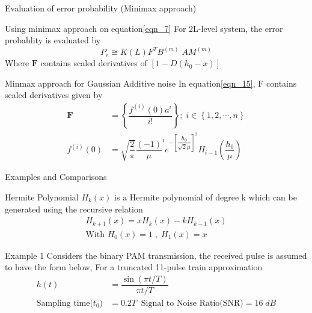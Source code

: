 \documentclass{beamer}
\providecommand{\mbf}{\boldsymbol}
\providecommand{\sbrak}[1]{\ensuremath{{}\left[#1\right]}}
\providecommand{\brak}[1]{\ensuremath{\left(#1\right)}}
\providecommand{\cbrak}[1]{\ensuremath{\left\{#1\right\}}}
\begin{document}
\begin{frame}{Evaluation of error probability (Minimax approach)}
\begin{block}{Using minimax approach on equation\eqref{eqn_7}}
For 2L-level system, the error probablity is evaluated by 
\begin{equation}
P_{e} \cong K(L)F^{T} B^{(m)}\;A M^{(m)}
\end{equation}
Where $\mbf{F}$ contains scaled derivatives of $\sbrak{1-D(h_{0}-x)}$
\end{block}
\begin{block}{Minmax approach for Gaussian Additive noise}
In equation\eqref{eqn_15}, F contains scaled derivatives given by
\begin{align}
\mbf{F} &= \cbrak{\dfrac{f^{(i)}(0) a^{i}}{i!}} ; \; i\in \cbrak{1,2,\cdots,n} \\
f^{(i)}(0) &= \sqrt{\dfrac{2}{\pi}} \dfrac{(-1)}{\mu}^{i} e^{-\sbrak{\dfrac{h_{0}}{\sqrt{2}\mu}}^{2}} H_{i-1}\brak{\dfrac{h_{0}}{\mu}}
\end{align}
\end{block}
\end{frame}
\begin{frame}{Examples and Comparisons}
\begin{block}{Hermite Polynomial}
$H_{k}(x)$ is a Hermite polynomial of degree k which can be generated using the recursive relation
\begin{align}
H_{k+1}(x) = x H_{k}(x) - k H_{k-1}(x) \\
\text{With } H_{0}(x) = 1 \;,\; H_{1}(x) = x
\end{align}
\end{block}
\begin{block}{Example 1}
Considers the binary PAM transmission, the received pulse is assumed to have the 
form below, For a truncated 11-pulse train approximation
\begin{align}
h(t) &= \dfrac{\sin{(\pi t/T)}}{\pi t/T} \\
\nonumber \text{Sampling time($t_{0}$)} &= 0.2T \; \; \text{Signal to Noise Ratio(SNR)} = 16\;dB
\end{align}
\end{block}
\end{frame}
\end{document}
